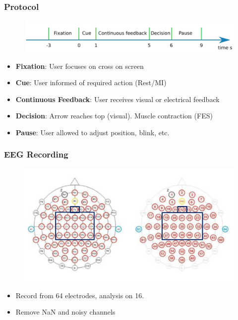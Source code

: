 \documentclass{beamer}
\begin{document}
\begin{frame}
\frametitle{Protocol}
\begin{figure}
\includegraphics[width=0.8\linewidth]{fig/protocol}
\end{figure}
\begin{itemize}
\item \textbf{Fixation}: User focuses on cross on screen
\item \textbf{Cue}: User informed of required action (Rest/MI)
\item \textbf{Continuous Feedback}: User receives visual or electrical feedback
\item \textbf{Decision}: Arrow reaches top (visual). Muscle contraction (FES)
\item \textbf{Pause}: User allowed to adjust position, blink, etc. 
\end{itemize}
\end{frame}


\begin{frame}
\frametitle{EEG Recording}
\begin{figure}
	\includegraphics[width=0.8\linewidth]{fig/EEG}
\end{figure}
\begin{itemize}
\item Record from 64 electrodes, analysis on 16.
\item Remove NaN and noisy channels
\end{itemize}
\end{frame}

\end{document}
